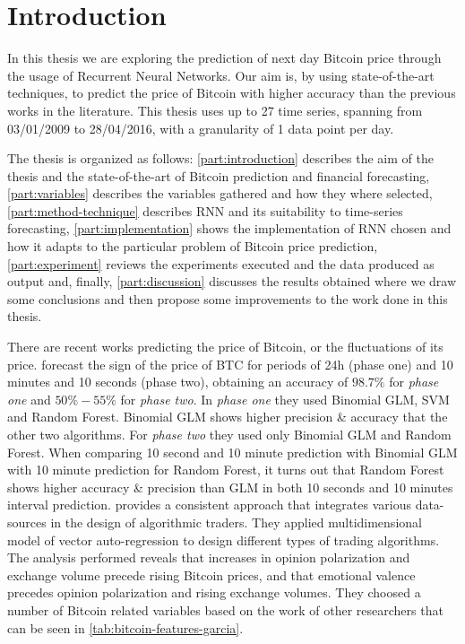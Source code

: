 
\chapter{Introduction} %

\label{ch:introduction}

In this thesis we are exploring the prediction of next day Bitcoin
price through the usage of Recurrent Neural Networks. Our aim is, by
using state-of-the-art techniques, to predict the price of Bitcoin
with higher accuracy than the previous works in the literature. This
thesis uses up to 27 time series, spanning from 03/01/2009 to
28/04/2016, with a granularity of 1 data point per day.

The thesis is organized as follows: \autoref{part:introduction}
describes the aim of the thesis and the state-of-the-art of Bitcoin
prediction and financial forecasting, \autoref{part:variables}
describes the variables gathered and how they where selected,
\autoref{part:method-technique} describes RNN and its suitability to
time-series forecasting, \autoref{part:implementation} shows the
implementation of RNN chosen and how it adapts to the particular
problem of Bitcoin price prediction, \autoref{part:experiment} reviews
the experiments executed and the data produced as output and, finally,
\autoref{part:discussion} discusses the results obtained where we draw
some conclusions and then propose some improvements to the work done
in this thesis.

There are recent works predicting the price of Bitcoin, or the
fluctuations of its price. \cite{madan_automated_2014} forecast the
sign of the price of BTC for periods of 24h (phase one) and 10 minutes
and 10 seconds (phase two), obtaining an accuracy of $98.7\%$ for
\textit{phase one} and $50\% - 55\%$ for \textit{phase two}. In
\textit{phase one} they used Binomial GLM, SVM and Random Forest.
Binomial GLM shows higher precision \& accuracy that the other two
algorithms. For \textit{phase two} they used only Binomial GLM and
Random Forest. When comparing 10 second and 10 minute prediction with
Binomial GLM with 10 minute prediction for Random Forest, it turns out
that Random Forest shows higher accuracy \& precision than GLM in both
10 seconds and 10 minutes interval prediction.
\cite{garcia_social_2015} provides a consistent approach that
integrates various data-sources in the design of algorithmic traders.
They applied multidimensional model of vector auto-regression to
design different types of trading algorithms. The analysis performed
reveals that increases in opinion polarization and exchange volume
precede rising Bitcoin prices, and that emotional valence precedes
opinion polarization and rising exchange volumes. They choosed a
number of Bitcoin related variables based on the work of other
researchers that can be seen in \autoref{tab:bitcoin-features-garcia}.

